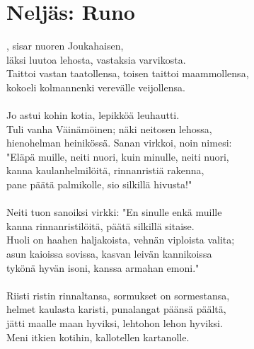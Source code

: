 
\chapter*{Neljäs: Runo}

, sisar nuoren Joukahaisen,        \\
läksi luutoa lehosta, vastaksia varvikosta.                    \\
Taittoi vastan taatollensa, toisen taittoi maammollensa,       \\
kokoeli kolmannenki verevälle veijollensa.                     \\
                                                               \\
Jo astui kohin kotia, lepikköä leuhautti.                      \\
Tuli vanha Väinämöinen; näki neitosen lehossa,                 \\
hienohelman heinikössä. Sanan virkkoi, noin nimesi:            \\
"Eläpä muille, neiti nuori, kuin minulle, neiti nuori,         \\
kanna kaulanhelmilöitä, rinnanristiä rakenna,                  \\
pane päätä palmikolle, sio silkillä hivusta!"                  \\
                                                               \\
Neiti tuon sanoiksi virkki: "En sinulle enkä muille            \\
kanna rinnanristilöitä, päätä silkillä sitaise.                \\
Huoli on haahen haljakoista, vehnän viploista valita;          \\
asun kaioissa sovissa, kasvan leivän kannikoissa               \\
tykönä hyvän isoni, kanssa armahan emoni."                     \\
                                                               \\
Riisti ristin rinnaltansa, sormukset on sormestansa,           \\
helmet kaulasta karisti, punalangat päänsä päältä,             \\
jätti maalle maan hyviksi, lehtohon lehon hyviksi.             \\
Meni itkien kotihin, kallotellen kartanolle.                   \\
